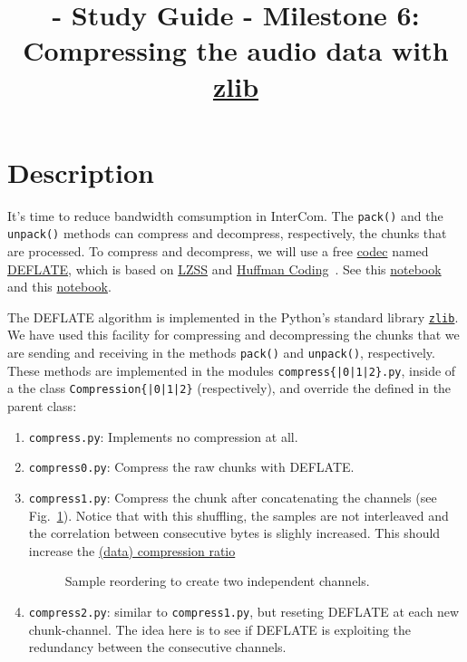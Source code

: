 
\title{\TM{} - Study Guide - Milestone 6: Compressing the audio data with \href{https://zlib.net/}{zlib}}

\maketitle

\section{Description}

It's time to reduce bandwidth comsumption in InterCom. The
\verb|pack()| and the \verb|unpack()| methods can compress and
decompress, respectively, the chunks that are processed. To compress
and decompress, we will use a free
\href{https://en.wikipedia.org/wiki/Codec}{codec} named
\href{https://en.wikipedia.org/wiki/DEFLATE}{DEFLATE}, which is based
on
\href{https://en.wikipedia.org/wiki/Lempel%E2%80%93Ziv%E2%80%93Storer%E2%80%93Szymanski}{LZSS}
  and \href{https://en.wikipedia.org/wiki/Huffman_coding}{Huffman
    Coding}~\cite{nelson96datacompression}. See this
  \href{https://github.com/vicente-gonzalez-ruiz/LZ77}{notebook} and
  this
  \href{https://vicente-gonzalez-ruiz.github.io/Huffman_coding/}{notebook}.

The DEFLATE algorithm is implemented in the Python's standard library
\href{https://docs.python.org/3/library/zlib.html}{\texttt{zlib}}. We
have used this facility for compressing and decompressing the chunks
that we are sending and receiving in the methods \verb|pack()| and
\verb|unpack()|, respectively. These methods are implemented in the
modules \texttt{compress\{|0|1|2\}.py}, inside of a the class
\texttt{Compression\{|0|1|2\}} (respectively), and
override the defined in the parent class:

\begin{enumerate}
\item \verb|compress.py|: Implements no compression at all.
\item \verb|compress0.py|: Compress the raw chunks with DEFLATE.
\item \verb|compress1.py|: Compress the chunk after concatenating the
  channels (see Fig.~\ref{fig:reordering}). Notice that with this
  shuffling, the samples are not interleaved and the correlation
  between consecutive bytes is slighly increased. This should increase
  the
  \href{https://en.wikipedia.org/wiki/Data_compression_ratio}{(data)
    compression ratio}
\begin{figure}
  \begin{center}
  \end{center}
  \caption{Sample reordering to create two independent channels.}
  \label{fig:reordering}
\end{figure}
\item \verb|compress2.py|: similar to \verb|compress1.py|, but
  reseting DEFLATE at each new chunk-channel. The idea here is to see
  if DEFLATE is exploiting the redundancy between the consecutive
  channels.
\end{enumerate}

